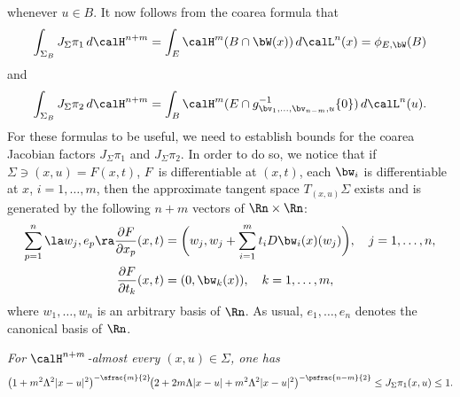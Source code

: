 \begin{Empty}
\begin{equation}
\end{equation}
whenever $u \in B$.
It now follows from the coarea formula that
\begin{equation}
\label{eq.9}
\int_{\Sigma_B} J_\Sigma \pi_1 \,d\calH^{n+m} = \int_E \calH^m(B \cap \bW(x)) \,d\calL^n(x) = \phi_{E,\bW}(B)
\end{equation}
and
\begin{equation}
\label{eq.10}
\int_{\Sigma_B} J_\Sigma \pi_2 \,d\calH^{n+m} = \int_B \calH^m(E \cap g_{\bv_1,\ldots,\bv_{n-m},u}^{-1}\{0\}) \,d\calL^n(u).
\end{equation}
For these formulas to be useful, we need to establish bounds for the coarea Jacobian factors $J_\Sigma \pi_1$ and $J_\Sigma \pi_2$.
In order to do so, we notice that if $\Sigma \ni (x,u) = F(x,t)$, $F$~is differentiable at $(x,t)$, \ie each $\bw_i$ is differentiable at $x$, $i=1,\ldots,m$, then the approximate tangent space $T_{(x,u)}\Sigma$ exists and is generated by the following $n+m$ vectors of $\Rn \times \Rn$:
\begin{equation*}
\begin{split}
\sum_{p=1}^n \la w_j, e_p \ra \frac{\partial F}{\partial x_p}(x,t) & = \biggl(w_j, w_j +\sum_{i=1}^m t_i D \bw_i(x)(w_j) \biggr), \quad j=1,\ldots,n, \\
\frac{\partial F}{\partial t_k}(x,t) & =(0, \bw_k(x)), \quad k=1,\ldots,m,
\end{split}
\end{equation*}
where $w_1,\ldots,w_n$ is an arbitrary basis of $\Rn$.
As usual, $e_1,\ldots,e_n$ denotes the canonical basis of $\Rn$.
\end{Empty}

\begin{Empty}
\label{factor.pi.1}
{\it
For $\calH^{n+m}$-almost every $(x,u) \in \Sigma$, one has
\begin{equation*}
\bigl(1 + m^2 \Lambda^2 |x-u|^2\bigr)^{-\sfrac{m}{2}}\!\bigl(2 + 2m\Lambda |x-u| + m^2\Lambda^2 |x-u|^2 \bigr)^{-\psfrac{n-m}{2}}
\leq J_\Sigma \pi_1(x,u) \leq 1.
\end{equation*}
}
\end{Empty}

